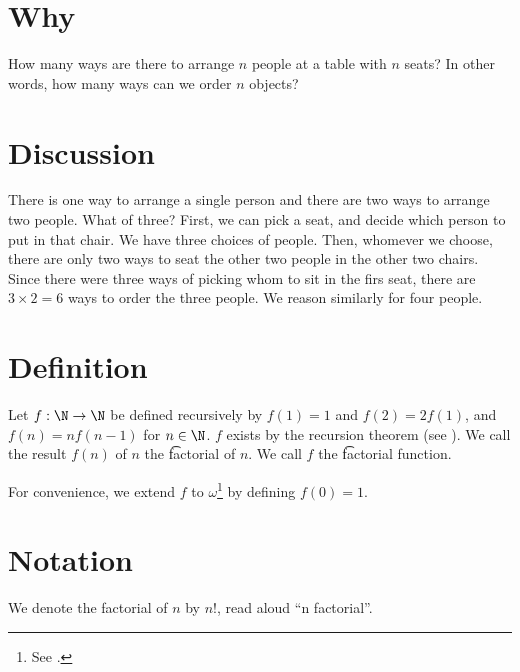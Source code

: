 

\section*{Why}

How many ways are there to arrange $n$ people at a table with $n$ seats?
In other words, how many ways can we order $n$ objects?

\section*{Discussion}

There is one way to arrange a single person and there are two ways to arrange two people.
What of three?
First, we can pick a seat, and decide which person to put in that chair.
We have three choices of people.
Then, whomever we choose, there are only two ways to seat the other two people in the other two chairs.
Since there were three ways of picking whom to sit in the firs seat, there are $3\times 2 = 6$ ways to order the three people.
We reason similarly for four people.

\section*{Definition}

Let $f: \N   \to \N  $ be defined recursively by $f(1) = 1$ and $f(2) = 2f(1)$, and $f(n) = nf(n-1)$ for $n \in \N  $.
$f$ exists by the recursion theorem (see ).
We call the result $f(n)$ of $n$ the \t{factorial} of $n$.
We call $f$ the \t{factorial function}.

For convenience, we extend $f$ to $\omega $\footnote{See .}
by defining $f(0) = 1$.

\section*{Notation}

We denote the factorial of $n$ by $n!$, read aloud ``n factorial''.

\blankpage
